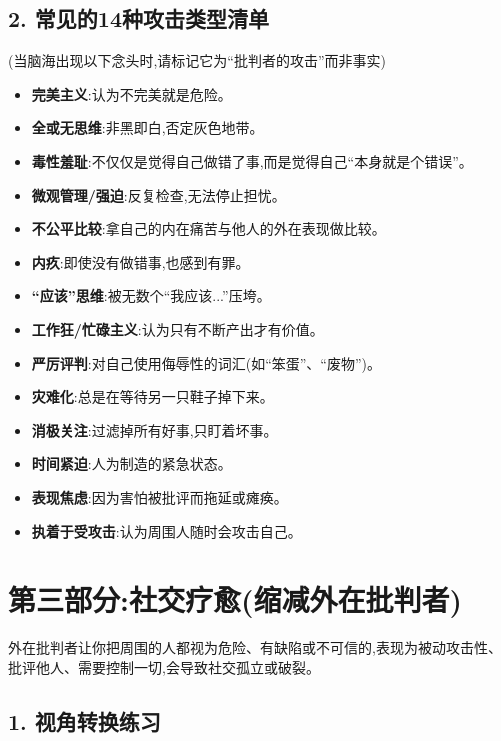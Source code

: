 \documentclass[11pt, a4paper]{article}
\begin{document}
\subsection*{2. 常见的14种攻击类型清单}
(当脑海出现以下念头时,请标记它为“批判者的攻击”而非事实)

\begin{itemize}[nosep, leftmargin=1.5em, itemsep=1pt]
    \item \textbf{完美主义}:认为不完美就是危险。
    \item \textbf{全或无思维}:非黑即白,否定灰色地带。
    \item \textbf{毒性羞耻}:不仅仅是觉得自己做错了事,而是觉得自己“本身就是个错误”。
    \item \textbf{微观管理/强迫}:反复检查,无法停止担忧。
    \item \textbf{不公平比较}:拿自己的内在痛苦与他人的外在表现做比较。
    \item \textbf{内疚}:即使没有做错事,也感到有罪。
    \item \textbf{“应该”思维}:被无数个“我应该...”压垮。
    \item \textbf{工作狂/忙碌主义}:认为只有不断产出才有价值。
    \item \textbf{严厉评判}:对自己使用侮辱性的词汇(如“笨蛋”、“废物”)。
    \item \textbf{灾难化}:总是在等待另一只鞋子掉下来。
    \item \textbf{消极关注}:过滤掉所有好事,只盯着坏事。
    \item \textbf{时间紧迫}:人为制造的紧急状态。
    \item \textbf{表现焦虑}:因为害怕被批评而拖延或瘫痪。
    \item \textbf{执着于受攻击}:认为周围人随时会攻击自己。
\end{itemize}

\endgroup %

\newpage

\section{第三部分:社交疗愈(缩减外在批判者)}

外在批判者让你把周围的人都视为危险、有缺陷或不可信的,表现为被动攻击性、批评他人、需要控制一切,会导致社交孤立或破裂。

\subsection*{1. 视角转换练习}
\end{document}
